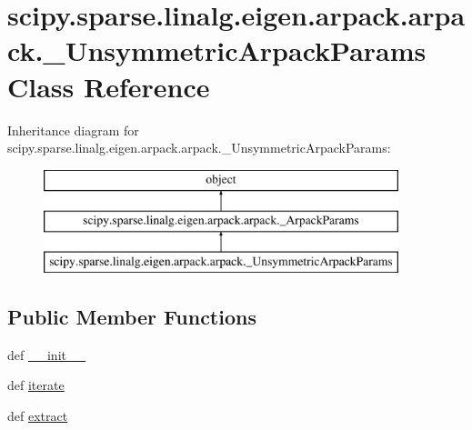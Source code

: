 \hypertarget{classscipy_1_1sparse_1_1linalg_1_1eigen_1_1arpack_1_1arpack_1_1__UnsymmetricArpackParams}{}\section{scipy.\+sparse.\+linalg.\+eigen.\+arpack.\+arpack.\+\_\+\+Unsymmetric\+Arpack\+Params Class Reference}
\label{classscipy_1_1sparse_1_1linalg_1_1eigen_1_1arpack_1_1arpack_1_1__UnsymmetricArpackParams}
Inheritance diagram for scipy.\+sparse.\+linalg.\+eigen.\+arpack.\+arpack.\+\_\+\+Unsymmetric\+Arpack\+Params\+:\begin{figure}[H]
\begin{center}
\leavevmode
\includegraphics[height=3.000000cm]{classscipy_1_1sparse_1_1linalg_1_1eigen_1_1arpack_1_1arpack_1_1__UnsymmetricArpackParams}
\end{center}
\end{figure}
\subsection*{Public Member Functions}
\begin{DoxyCompactItemize}
\item 
def \hyperlink{classscipy_1_1sparse_1_1linalg_1_1eigen_1_1arpack_1_1arpack_1_1__UnsymmetricArpackParams_a1a6b5a14583be8490b0dc92268aed2fd}{\+\_\+\+\_\+init\+\_\+\+\_\+}
\item 
def \hyperlink{classscipy_1_1sparse_1_1linalg_1_1eigen_1_1arpack_1_1arpack_1_1__UnsymmetricArpackParams_a4ec2598280e2a7a04725ae0cd1ca7c1e}{iterate}
\item 
def \hyperlink{classscipy_1_1sparse_1_1linalg_1_1eigen_1_1arpack_1_1arpack_1_1__UnsymmetricArpackParams_ad5cb676584c3a4bca52fb9c341b0060d}{extract}
\end{DoxyCompactItemize}
